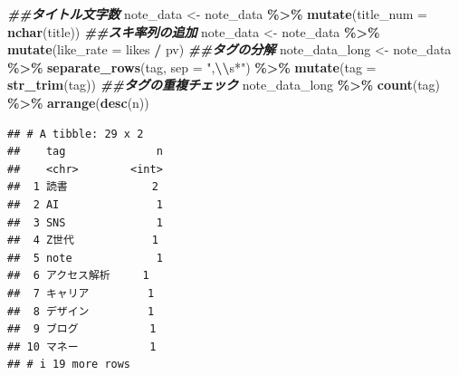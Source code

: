\documentclass[
]{article}
\newenvironment{Shaded}{\begin{snugshade}}{\end{snugshade}}
\newcommand{\AttributeTok}[1]{\textcolor[rgb]{0.13,0.29,0.53}{#1}}
\newcommand{\DocumentationTok}[1]{\textcolor[rgb]{0.56,0.35,0.01}{\textbf{\textit{#1}}}}
\newcommand{\FunctionTok}[1]{\textcolor[rgb]{0.13,0.29,0.53}{\textbf{#1}}}
\newcommand{\NormalTok}[1]{#1}
\newcommand{\OtherTok}[1]{\textcolor[rgb]{0.56,0.35,0.01}{#1}}
\newcommand{\SpecialCharTok}[1]{\textcolor[rgb]{0.81,0.36,0.00}{\textbf{#1}}}
\newcommand{\StringTok}[1]{\textcolor[rgb]{0.31,0.60,0.02}{#1}}
\begin{document}
\begin{Shaded}
\begin{Highlighting}[]
\DocumentationTok{\#\#タイトル文字数}
\NormalTok{note\_data }\OtherTok{\textless{}{-}}\NormalTok{ note\_data }\SpecialCharTok{\%\textgreater{}\%}
  \FunctionTok{mutate}\NormalTok{(}\AttributeTok{title\_num =} \FunctionTok{nchar}\NormalTok{(title))}
\DocumentationTok{\#\#スキ率列の追加}
\NormalTok{note\_data }\OtherTok{\textless{}{-}}\NormalTok{ note\_data }\SpecialCharTok{\%\textgreater{}\%}
  \FunctionTok{mutate}\NormalTok{(}\AttributeTok{like\_rate =}\NormalTok{ likes }\SpecialCharTok{/}\NormalTok{ pv)}
\DocumentationTok{\#\#タグの分解}
\NormalTok{note\_data\_long }\OtherTok{\textless{}{-}}\NormalTok{ note\_data }\SpecialCharTok{\%\textgreater{}\%}
  \FunctionTok{separate\_rows}\NormalTok{(tag, }\AttributeTok{sep =} \StringTok{",}\SpecialCharTok{\textbackslash{}\textbackslash{}}\StringTok{s*"}\NormalTok{) }\SpecialCharTok{\%\textgreater{}\%}
  \FunctionTok{mutate}\NormalTok{(}\AttributeTok{tag =} \FunctionTok{str\_trim}\NormalTok{(tag))}
\DocumentationTok{\#\#タグの重複チェック}
\NormalTok{note\_data\_long }\SpecialCharTok{\%\textgreater{}\%}
  \FunctionTok{count}\NormalTok{(tag) }\SpecialCharTok{\%\textgreater{}\%}
  \FunctionTok{arrange}\NormalTok{(}\FunctionTok{desc}\NormalTok{(n))}
\end{Highlighting}
\end{Shaded}

\begin{verbatim}
## # A tibble: 29 x 2
##    tag              n
##    <chr>        <int>
##  1 読書             2
##  2 AI               1
##  3 SNS              1
##  4 Z世代            1
##  5 note             1
##  6 アクセス解析     1
##  7 キャリア         1
##  8 デザイン         1
##  9 ブログ           1
## 10 マネー           1
## # i 19 more rows
\end{verbatim}
\end{document}
